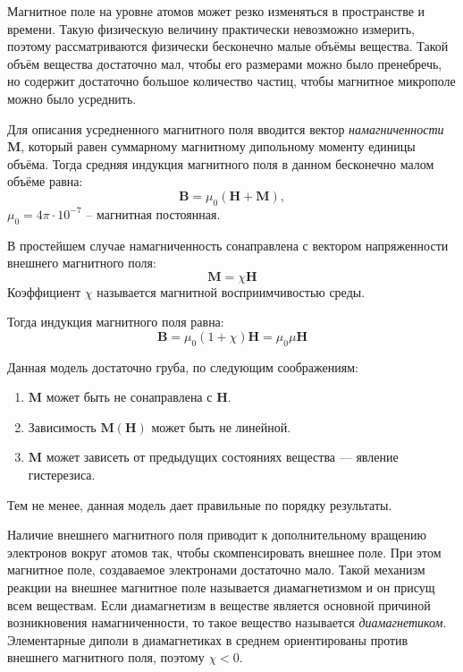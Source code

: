 \documentclass[12pt,a4paper]{article}
\begin{document}
	Магнитное поле на уровне атомов может резко изменяться в пространстве и времени. Такую физическую величину практически невозможно измерить, поэтому рассматриваются физически бесконечно малые объёмы вещества. Такой объём вещества достаточно мал, чтобы его размерами можно было пренебречь, но содержит достаточно большое количество частиц, чтобы магнитное микрополе можно было усреднить.
	
	Для описания усредненного магнитного поля вводится вектор \textit{намагниченности} $\boldsymbol{M}$, который равен суммарному магнитному дипольному моменту единицы объёма. Тогда средняя индукция магнитного поля в данном бесконечно малом объёме равна:
	$$
	\boldsymbol{B} = \mu_0 (\boldsymbol{H} + \boldsymbol{M}),
	$$
	$\mu_0 = 4 \pi \cdot 10^{-7}$ -- магнитная постоянная.
	
	В простейшем случае намагниченность сонаправлена с вектором напряженности внешнего магнитного поля:
	$$
	\boldsymbol{M} = \chi \boldsymbol{H}
	$$
	Коэффициент $\chi$ называется магнитной восприимчивостью среды.

	Тогда индукция магнитного поля равна:
	$$
	\boldsymbol{B} =  \mu_0 (1 + \chi) \boldsymbol{H} = \mu_0 \mu \boldsymbol{H}
	$$
	
	Данная модель достаточно груба, по следующим соображениям:
	\begin{enumerate}
		\item $\boldsymbol{M}$ может быть не сонаправлена с $\boldsymbol{H}$.

		\item Зависимость $\boldsymbol{M}(\boldsymbol{H})$ может быть не линейной.
		
		\item $\boldsymbol{M}$ может зависеть от предыдущих состояниях вещества --- явление гистерезиса.
	\end{enumerate}
	Тем не менее, данная модель дает правильные по порядку результаты.
	
	Наличие внешнего магнитного поля приводит к дополнительному вращению электронов вокруг атомов так, чтобы скомпенсировать внешнее поле. При этом магнитное поле, создаваемое электронами достаточно мало. Такой механизм реакции на внешнее магнитное поле называется диамагнетизмом и он присущ всем веществам. Если диамагнетизм в веществе является основной причиной возникновения намагниченности, то такое вещество называется \textit{диамагнетиком}. Элементарные диполи в диамагнетиках в среднем ориентированы против внешнего магнитного поля, поэтому $\chi < 0$.
	
\end{document}
